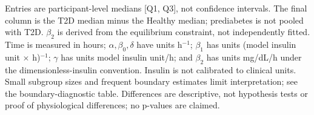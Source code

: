 \begin{table}[htbp]
\centering
\caption{Participant-level kinetic estimates by clinical status (Healthy: n=20, Prediabetes: n=7, Type 2 diabetes: n=3).}
\label{tab:parameter-group-comparison}
\small
{}
\par\smallskip
\begin{minipage}{\linewidth}\footnotesize
Entries are participant-level medians [Q1, Q3], not confidence intervals. The final column is the T2D median minus the Healthy median; prediabetes is not pooled with T2D. $\beta_2$ is derived from the equilibrium constraint, not independently fitted. Time is measured in hours; $\alpha,\beta_0,\delta$ have units h$^{-1}$; $\beta_1$ has units (model insulin unit $\times$ h)$^{-1}$; $\gamma$ has units model insulin unit/h; and $\beta_2$ has units mg/dL/h under the dimensionless-insulin convention. Insulin is not calibrated to clinical units. Small subgroup sizes and frequent boundary estimates limit interpretation; see the boundary-diagnostic table. Differences are descriptive, not hypothesis tests or proof of physiological differences; no p-values are claimed.
\end{minipage}
\end{table}
